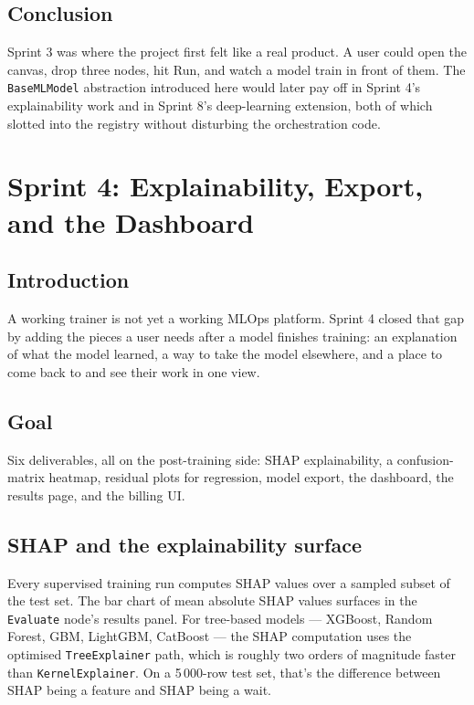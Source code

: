 \documentclass[12pt, a4paper]{report}
\begin{document}
\section*{Conclusion}

Sprint 3 was where the project first felt like a real product. A user
could open the canvas, drop three nodes, hit Run, and watch a model
train in front of them. The \texttt{BaseMLModel} abstraction
introduced here would later pay off in Sprint 4's explainability work
and in Sprint 8's deep-learning extension, both of which slotted into
the registry without disturbing the orchestration code.

\chapter{Sprint 4: Explainability, Export, and the Dashboard}

\section*{Introduction}

A working trainer is not yet a working MLOps platform. Sprint 4 closed
that gap by adding the pieces a user needs after a model finishes
training: an explanation of what the model learned, a way to take the
model elsewhere, and a place to come back to and see their work in one
view.

\section{Goal}

Six deliverables, all on the post-training side: SHAP explainability,
a confusion-matrix heatmap, residual plots for regression, model
export, the dashboard, the results page, and the billing UI.

\section{SHAP and the explainability surface}

Every supervised training run computes SHAP values over a sampled
subset of the test set. The bar chart of mean absolute SHAP values
surfaces in the \texttt{Evaluate} node's results panel. For tree-based
models --- XGBoost, Random Forest, GBM, LightGBM, CatBoost --- the
SHAP computation uses the optimised \texttt{TreeExplainer} path, which
is roughly two orders of magnitude faster than
\texttt{KernelExplainer}. On a 5\,000-row test set, that's the
difference between SHAP being a feature and SHAP being a wait.
\end{document}
